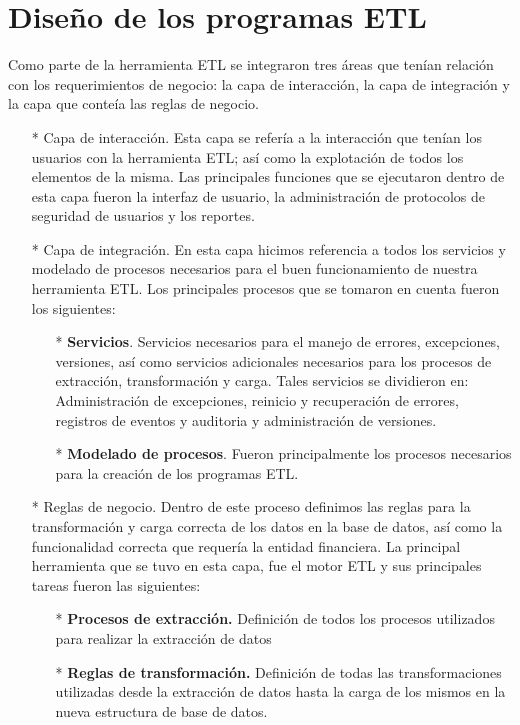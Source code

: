 \documentclass[a4paper,openright,12pt]{book}
\begin{document}
\section{Dise\~no de los programas ETL}
Como parte de la herramienta ETL se integraron tres \'areas que ten\'ian relaci\'on con los requerimientos de negocio: la capa de interacci\'on, la capa de integraci\'on y la capa que conte\'ia las reglas de negocio.

\begin{itemize}
\item[*] Capa de interacci\'on. Esta capa se refer\'ia a la interacci\'on que ten\'ian los usuarios con la herramienta ETL; as\'i como la explotaci\'on de todos los elementos de la misma. Las principales funciones que se ejecutaron dentro de esta capa fueron la interfaz de usuario, la administraci\'on de protocolos de seguridad de usuarios y los reportes.
\item[*] Capa de integraci\'on. En esta capa hicimos referencia a todos los servicios y modelado de procesos necesarios para el buen funcionamiento de nuestra herramienta ETL. Los principales procesos que se tomaron en cuenta fueron los siguientes:
\begin{itemize}
\item[*] \textbf{Servicios}. Servicios necesarios para el manejo de errores, excepciones, versiones, as\'i como servicios adicionales necesarios para los procesos de extracci\'on, transformaci\'on y carga. Tales servicios se dividieron en: Administraci\'on de excepciones, reinicio y recuperaci\'on de errores, registros de eventos y auditoria y administraci\'on de versiones.
\item[*] \textbf{Modelado de procesos}. Fueron principalmente los procesos necesarios para la creaci\'on de los programas ETL. 
\end{itemize}
\item[*] Reglas de negocio. Dentro de este proceso definimos las reglas para la transformaci\'on y carga correcta de los datos en la base de datos, as\'i como la funcionalidad correcta que requer\'ia la entidad financiera. La principal herramienta que se tuvo en esta capa, fue el motor ETL y sus principales tareas fueron las siguientes:
\begin{itemize}
\item[*] \textbf{Procesos de extracci\'on.} Definici\'on de todos los procesos utilizados para realizar la extracci\'on de datos
\item[*] \textbf{Reglas de transformaci\'on.} Definici\'on de todas las transformaciones utilizadas desde la extracci\'on de datos hasta la carga de los mismos en la nueva estructura de base de datos.

\end{itemize}
\end{itemize}
\end{document}
